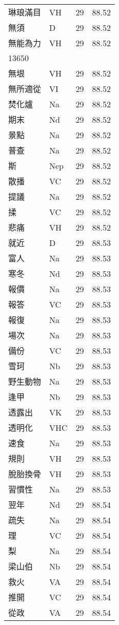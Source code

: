\documentclass[twocolumn]{book}
\begin{document}
\begin{supertabular}{llrr}
琳琅滿目 & VH & 29 &  88.52\\
無須 & D & 29 &  88.52\\
無能為力 & VH & 29 &  88.52\\
13650\\
無垠 & VH & 29 &  88.52\\
無所適從 & VI & 29 &  88.52\\
焚化爐 & Na & 29 &  88.52\\
期末 & Nd & 29 &  88.52\\
景點 & Na & 29 &  88.52\\
普查 & Na & 29 &  88.52\\
斯 & Nep & 29 &  88.52\\
散播 & VC & 29 &  88.52\\
提議 & Na & 29 &  88.52\\
揉 & VC & 29 &  88.52\\
悲痛 & VH & 29 &  88.52\\
就近 & D & 29 &  88.53\\
富人 & Na & 29 &  88.53\\
寒冬 & Nd & 29 &  88.53\\
報價 & Na & 29 &  88.53\\
報答 & VC & 29 &  88.53\\
報復 & Na & 29 &  88.53\\
場次 & Na & 29 &  88.53\\
備份 & VC & 29 &  88.53\\
雪珂 & Nb & 29 &  88.53\\
野生動物 & Na & 29 &  88.53\\
逢甲 & Nb & 29 &  88.53\\
透露出 & VK & 29 &  88.53\\
透明化 & VHC & 29 &  88.53\\
速食 & Na & 29 &  88.53\\
規則 & VH & 29 &  88.53\\
脫胎換骨 & VH & 29 &  88.53\\
習慣性 & Na & 29 &  88.53\\
翌年 & Nd & 29 &  88.54\\
疏失 & Na & 29 &  88.54\\
理 & VC & 29 &  88.54\\
梨 & Na & 29 &  88.54\\
梁山伯 & Nb & 29 &  88.54\\
救火 & VA & 29 &  88.54\\
推開 & VC & 29 &  88.54\\
從政 & VA & 29 &  88.54\\

\end{supertabular}
\end{document}
